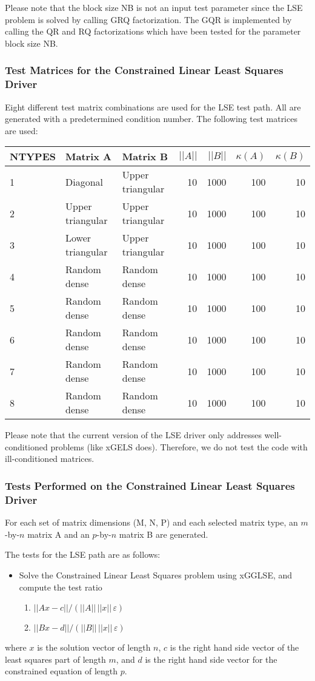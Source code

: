 Please note that the block size NB is not an input
test parameter since the LSE problem is solved by calling GRQ factorization.
The GQR is implemented by calling the QR and RQ factorizations
which have been tested for the parameter block size NB.

\subsubsection{Test Matrices for the Constrained Linear Least Squares Driver}
\dent
Eight different test matrix combinations are used for the LSE test path.
All are generated with a predetermined condition number.
The following test matrices are used:
\TS
\begin{tabular}{|l|l|l|r|r|r|r|} \hline
NTYPES & Matrix A & Matrix B & $||A||$ & $||B||$ & $\kappa(A)$ &
$\kappa(B)$ \\
\hline
1      & Diagonal & Upper triangular & 10 & 1000 & 100 & 10 \\
2      & Upper triangular & Upper triangular & 10 & 1000 & 100 & 10 \\
3      & Lower triangular & Upper triangular & 10 & 1000 & 100 & 10 \\
4      & Random dense & Random dense & 10 & 1000 & 100 & 10 \\
5      & Random dense & Random dense & 10 & 1000 & 100 & 10 \\
6      & Random dense & Random dense & 10 & 1000 & 100 & 10 \\
7      & Random dense & Random dense & 10 & 1000 & 100 & 10 \\
8      & Random dense & Random dense & 10 & 1000 & 100 & 10 \\ \hline
\end{tabular}
\TE

Please note that the current version of the LSE driver only addresses
well-conditioned problems (like xGELS does).  Therefore, we do not test
the code with ill-conditioned matrices.

\subsubsection{Tests Performed on the Constrained Linear Least Squares Driver}
\dent
For each set of matrix dimensions (M, N, P) and each selected matrix
type, an $m$-by-$n$ matrix A and an $p$-by-$n$ matrix B are generated.

The tests for the LSE path are as follows:
\begin{itemize}
\item Solve the Constrained Linear Least Squares problem using xGGLSE,
and compute the test ratio
\begin{enumerate}
\item $|| A x - c || / (||A|| \, ||x|| \, \varepsilon)$
\item $|| B x - d || / (||B|| \, ||x|| \, \varepsilon)$
\end{enumerate}
\end{itemize}
where $x$ is the solution vector of length $n$, $c$ is the right hand
side vector of the least squares part of length $m$, and $d$ is the right
hand side vector for the constrained equation of length $p$.

